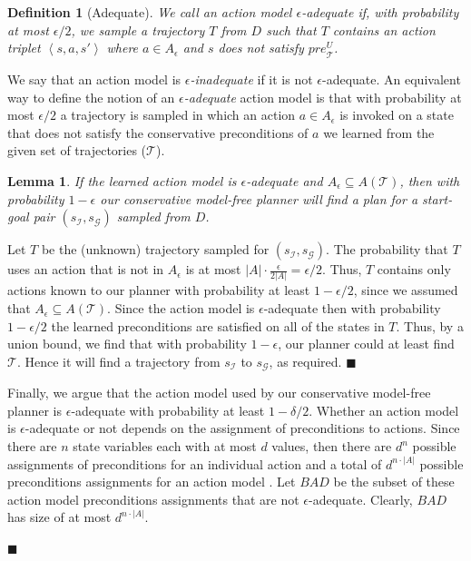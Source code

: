 \documentclass{article}
\newtheorem{definition}{Definition}
\newtheorem{lemma}{Lemma}
\newenvironment{proof}{\noindent{\bf Proof:~~}}{\qed}
\newcommand{\tuple}[1]{\ensuremath{\left \langle #1 \right \rangle }}
\newcommand{\qed}{\hfill\ensuremath{\blacksquare}}
\newcommand{\pre}{\textit{pre}}
\begin{document}
\begin{proof}
		\begin{definition}[Adequate]
			We call an action model {\em $\epsilon$-adequate} if, with probability at most $\epsilon/2$, we sample a trajectory $T$ from $D$ such that $T$ contains an action triplet $\tuple{s,a,s'}$  where $a\in A_\epsilon$ and $s$ does not satisfy $\pre_\mathcal{T}^U$. 
			\label{def:adequate}
		\end{definition}
		We say that an action model is {\em $\epsilon$-inadequate} if it is not $\epsilon$-adequate. 
		An equivalent way to define the notion of an {\em $\epsilon$-adequate} action model is
		that with probability at most $\epsilon/2$ 
		a trajectory is sampled in which an action $a\in A_\epsilon$ is invoked on a state that 
		does not satisfy the conservative preconditions of $a$ we learned from the given set of trajectories ($\mathcal{T}$).  
		
		
		\begin{lemma}
			If the learned action model is $\epsilon$-adequate and $A_\epsilon\subseteq A(\mathcal{T})$, 
			then with probability $1-\epsilon$ our conservative model-free planner will find a plan for a start-goal pair $(s_\mathcal{I},s_\mathcal{G})$ sampled from $D$.
			\label{lem:plan-existance}
		\end{lemma}
		\begin{proof}
			Let $T$ be the (unknown) trajectory sampled for $(s_\mathcal{I},s_\mathcal{G})$. 
			The probability that $T$ uses an action that is not in 
			$A_\epsilon$ is at most $|A|\cdot\frac{\epsilon}{2|A|}=\epsilon/2$. 
			Thus, $T$ contains only actions known to our planner with probability at least $1-\epsilon/2$, since we assumed that $A_\epsilon\subseteq A(\mathcal{T})$. 
			Since the action model is $\epsilon$-adequate then with probability $1-\epsilon/2$ the learned preconditions are satisfied on all of the states in $T$. Thus, by a union bound, we find that with probability $1-\epsilon$, our planner could at least find $\mathcal{T}$. Hence it will find a trajectory from $s_\mathcal{I}$ to $s_\mathcal{G}$, as required. 
		\end{proof}
		
		
		Finally, we argue that the action model used by our conservative model-free planner is $\epsilon$-adequate with probability at least $1-\delta/2$. 
		Whether an action model is $\epsilon$-adequate or not depends on the assignment of preconditions to actions. 
		Since there are $n$ state variables each with at most $d$ values, 
		then there are $d^n$ possible assignments of preconditions for an individual action
		and a total of $d^{n\cdot |A|}$ possible preconditions assignments for an action model . 
		Let $BAD$ be the subset of these action model preconditions assignments that are not $\epsilon$-adequate. 
		Clearly, $BAD$ has size of at most $d^{n\cdot |A|}$. 
		

\end{proof}
\end{document}
